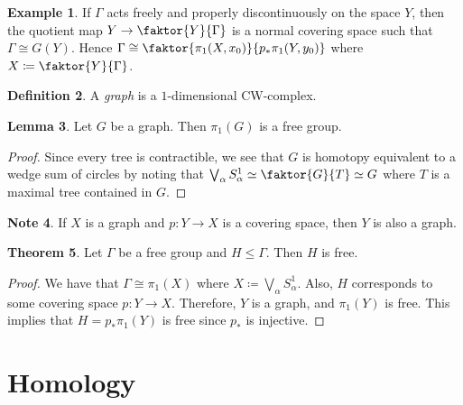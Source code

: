 \documentclass[10pt,letterpaper,cm]{nupset}
\theoremstyle{definition}
\newtheorem{definition}{Definition}[subsection]
\newtheorem{exmp}[definition]{Example}
\newtheorem{note}[definition]{Note}
\theoremstyle{theorem}
\newtheorem{theorem}[definition]{Theorem}
\newtheorem{lemma}[definition]{Lemma}
\theoremstyle{remark}
\newcommand{\1}{\mathbb{1}}
\newcommand{\0}{\vec 0}
\begin{document}
\begin{exmp}
If $\Gamma$ acts freely and properly discontinuously on the space $Y$, then the quotient map $Y \to \faktor{Y}{\Gamma}$ is a normal covering space such that $\Gamma \cong G(Y)$. Hence $\Gamma \cong \faktor{\pi_1(X, x_0)}{p_{\ast}\pi_1(Y, y_0)}$ where $X\coloneqq  \faktor{Y}{\Gamma}$.
\end{exmp}

\begin{definition}
A \textit{graph} is a $1$-dimensional CW-complex. 
\end{definition}

\begin{lemma}
Let $G$ be a graph.  Then $\pi_1(G)$ is a free group.
\end{lemma}
\begin{proof}
Since every tree is contractible, we see that $G$ is homotopy equivalent to a wedge sum of circles by noting that $\bigvee_{\alpha} S_{\alpha}^1 \simeq \faktor{G}{T}\simeq G$ where $T$ is a maximal tree contained in $G$. 
\end{proof}

\begin{note}
If $X$ is a graph and $p: Y \to X$ is a covering space, then $Y$ is also a graph. 
\end{note}

\begin{theorem}
Let $\Gamma$ be a free group and $H\leq \Gamma$. Then $H$ is free. 
\end{theorem}
\begin{proof}
We have that $\Gamma \cong \pi_1(X)$ where $X\coloneqq  \bigvee_{\alpha} S_{\alpha}^1$. Also, $H$ corresponds to some covering space $p: Y \to X$. Therefore, $Y$ is a graph, and $\pi_1(Y)$ is free. This implies that $H= p_{\ast}\pi_1(Y)$ is free since $p_{\ast}$ is injective. 
\end{proof}

\section{Homology} 
\end{document}
